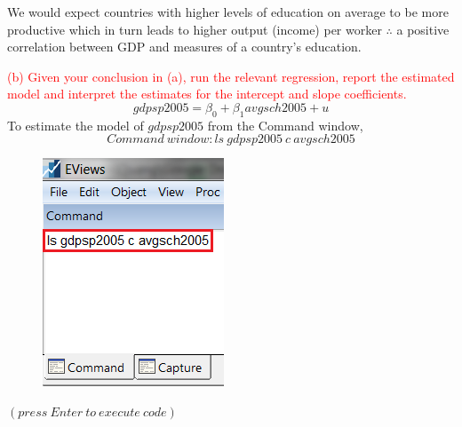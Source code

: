 \documentclass[12pt]{report}
\begin{document}
\noindent We would expect countries with higher levels of education on average to be more productive which in turn leads to higher output (income) per worker $\therefore$ a positive correlation between GDP and measures of a country's education.

\noindent \textcolor{red}{(b) Given your conclusion in (a), run the relevant regression, report the estimated model and interpret the estimates for the intercept and slope coefficients.}
$$gdpsp2005 = \beta_0 + \beta_1 avgsch2005 + u$$
\noindent To estimate the model of $gdpsp2005$ from the Command window,
$$Command\ window: ls\ gdpsp2005\ c\ avgsch2005$$
\begin{figure}[H]
	\centering
	\includegraphics{tute6_q4_2}
\end{figure}
\vspace{-\baselineskip} \centering $(press\ Enter\ to\ execute\ code)$
\end{document}
